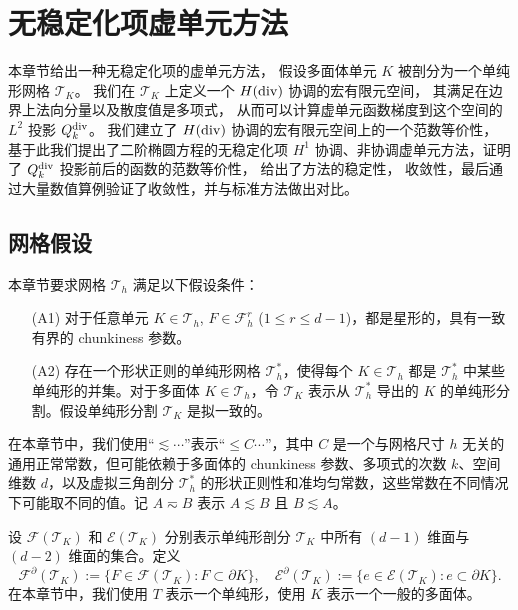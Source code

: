 \chapter{无稳定化项虚单元方法}
本章节给出一种无稳定化项的虚单元方法，
假设多面体单元 $K$ 被剖分为一个单纯形网格 $\mathcal T_K$。
我们在 $\mathcal{T}_K$ 上定义一个 $H(\operatorname{div})$ 协调的宏有限元空间，
其满足在边界上法向分量以及散度值是多项式，
从而可以计算虚单元函数梯度到这个空间的 $L^2$ 投影 $Q_k^{\operatorname{div}}$。
我们建立了 $H(\operatorname{div})$ 协调的宏有限元空间上的一个范数等价性，
基于此我们提出了二阶椭圆方程的无稳定化项 
$H^1$ 协调、非协调虚单元方法，证明了 $Q_k^{\operatorname{div}}$ 投影前后的函数的范数等价性，
给出了方法的稳定性，
收敛性，最后通过大量数值算例验证了收敛性，并与标准方法做出对比。

\section{网格假设}
本章节要求网格 $\mathcal T_h$ 满足以下假设条件：
\begin{itemize}
    \item[(A1)] 对于任意单元 $K\in \mathcal T_h$, $F\in \mathcal F_h^r$ ($1\leq
        r\leq d-1$)，都是星形的，具有一致有界的 chunkiness 参数。

 \item[(A2)] 存在一个形状正则的单纯形网格 $\mathcal T_h^*$，使得每个 $K\in
     \mathcal T_h$ 都是 $\mathcal T_h^*$ 中某些单纯形的并集。对于多面体 $K\in
     \mathcal T_h$，令 $\mathcal T_K$ 表示从 $\mathcal T_h^*$ 导出的 $K$
     的单纯形分割。假设单纯形分割 $\mathcal T_K$ 是拟一致的。
\end{itemize}
在本章节中，我们使用“$\lesssim\cdots $”表示“$\leq C\cdots$”，其中 $C$
是一个与网格尺寸 $h$
无关的通用正常常数，但可能依赖于多面体的 chunkiness 参数、多项式的次数 $k$、空间维数
$d$，以及虚拟三角剖分 $\mathcal T^*_h$
的形状正则性和准均匀常数，这些常数在不同情况下可能取不同的值。记 $A\eqsim B$
表示 $A\lesssim B$ 且 $B\lesssim A$。

设 $\mathcal{F}(\mathcal{T}_K)$ 和 $\mathcal{E}(\mathcal{T}_K)$ 分别表示单纯形剖分 $\mathcal{T}_K$ 中所有 $(d-1)$ 维面与 $(d-2)$ 维面的集合。定义  
\[
\mathcal{F}^{\partial}(\mathcal{T}_K):=\{F\in\mathcal{F}(\mathcal{T}_K): F\subset\partial K\},\quad \mathcal{E}^{\partial}(\mathcal{T}_K):=\{e\in\mathcal{E}(\mathcal{T}_K): e\subset\partial K\}.
\]
在本章节中，我们使用 $T$ 表示一个单纯形，使用 $K$ 表示一个一般的多面体。
